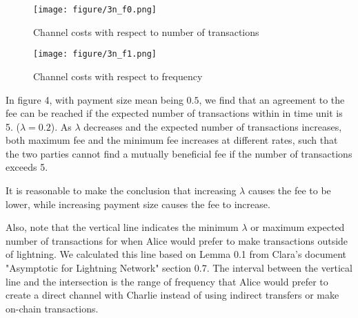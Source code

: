 \documentclass[twocolumn,10pt]{report}
\begin{document}
\begin{figure}[t]
    \begin{center}
    \setlength{\unitlength}{0.012500in}%
    \texttt{[image: figure/3n\_f0.png]}
    \end{center}
    \caption{Channel costs with respect to number of transactions}
    \label{figure_3Node4} 
\end{figure}
\begin{figure}[t]
    \begin{center}
    \setlength{\unitlength}{0.012500in}%
    \texttt{[image: figure/3n\_f1.png]}
    \end{center}
    \caption{Channel costs with respect to frequency}
    \label{figure_3Node5} 
\end{figure}
In figure 4, with payment size mean being $0.5$, we find that an agreement to the fee can be reached if the expected number of transactions within in time unit is 5. ($\lambda = 0.2$). As $\lambda$ decreases and the expected number of transactions increases, both maximum fee and the minimum fee increases at different rates, such that the two parties cannot find a mutually beneficial fee if the number of transactions exceeds 5. 

It is reasonable to make the conclusion that increasing $\lambda$ causes the fee to be lower, while increasing payment size causes the fee to increase. 

Also, note that the vertical line indicates the minimum $\lambda$ or maximum expected number of transactions for when Alice would prefer to make transactions outside of lightning. We calculated this line based on Lemma 0.1 from Clara's document "Asymptotic for Lightning Network" section 0.7. The interval between the vertical line and the intersection is the range of frequency that Alice would prefer to create a direct channel with Charlie instead of using indirect transfers or make on-chain transactions. 
\end{document}
